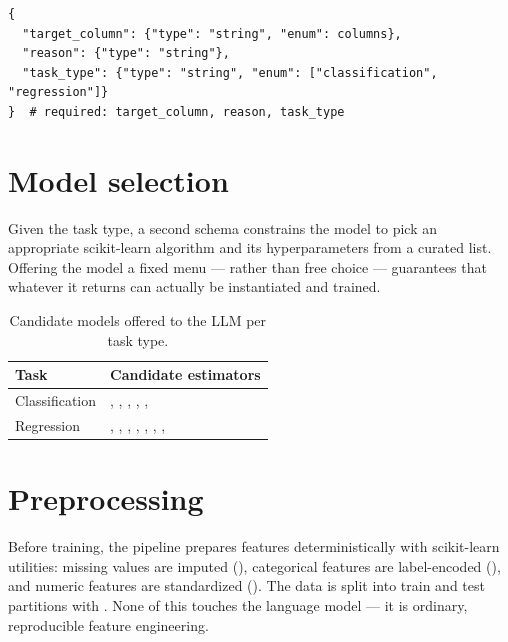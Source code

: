 \begin{lstlisting}[style=py,caption={The target-selection schema (abridged).}]
{
  "target_column": {"type": "string", "enum": columns},
  "reason": {"type": "string"},
  "task_type": {"type": "string", "enum": ["classification", "regression"]}
}  # required: target_column, reason, task_type
\end{lstlisting}

\section{Model selection}
Given the task type, a second schema constrains the model to pick an appropriate
scikit-learn algorithm and its hyperparameters from a curated list. Offering the
model a fixed menu --- rather than free choice --- guarantees that whatever it
returns can actually be instantiated and trained.

\begin{table}[h]
\centering
\caption{Candidate models offered to the LLM per task type.}
\small
\begin{tabularx}{\linewidth}{@{}L{3.0cm} X@{}}
\toprule
\textbf{Task} & \textbf{Candidate estimators} \\
\midrule
Classification & , ,
, ,
,  \\
Regression & , , ,
, ,
, ,  \\
\bottomrule
\end{tabularx}
\end{table}

\section{Preprocessing}
Before training, the pipeline prepares features deterministically with
scikit-learn utilities: missing values are imputed (),
categorical features are label-encoded (), and numeric
features are standardized (). The data is split into train
and test partitions with . None of this touches the
language model --- it is ordinary, reproducible feature engineering.

